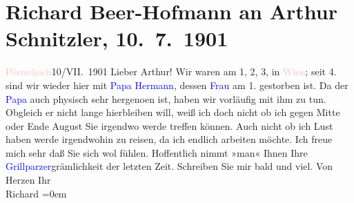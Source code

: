 

               \section[Richard Beer-Hofmann an Arthur Schnitzler, 10. 7. 1901]{ Richard Beer-Hofmann an Arthur Schnitzler,
               10. 7. 1901}\nopagebreak{}\rehead{ }\normalsize\beginnumbering{} \toendnotes[C]{\smallbreak\pagebreak[2]} 
\toendnotes[C]{\smallbreak}\pstart
           \raggedleft{}{\pb}\textcolor{pink}{Pörtschach}{}\ledrightnote{\textcolor{pink}{Pörtschach}}{ }10/VII. 1901\pend
           \pstart
           Lieber Arthur! Wir waren am 1, 2,
                  3, in \textcolor{pink}{Wien}{}\ledrightnote{\textcolor{pink}{Wien}}; seit 4. sind
               wir wieder hier mit \textcolor{blue}{Papa Hermann}{}\ledrightnote{\textcolor{blue}{Hermann Beer}}, dessen \textcolor{blue}{Frau}{} am 1.
               gestorben ist. Da der \textcolor{blue}{Papa}{} auch
               physisch sehr hergeno{\geminationm}en ist, haben wir vorläufig mit
               ihm zu tun. Obgleich er nicht lange hierbleiben will, weiß ich doch nicht ob ich
               gegen Mitte oder Ende August Sie irgendwo werde treffen
               können.\pend
           \pstart
           {\pb}Auch nicht ob ich Lust haben werde
               irgendwohin zu reisen, da ich endlich arbeiten möchte. Ich freue mich sehr daß Sie
               sich wol fühlen. Hoffentlich nimmt »man« Ihnen Ihre \textcolor{blue}{Grillparzer}{}\ledrightnote{\textcolor{blue}{Franz Grillparzer}}grämlichkeit der letzten Zeit. Schreiben Sie mir bald und
               viel.\pend
           \pstart
           Von Herzen Ihr{\\[\baselineskip]}\spacefill\mbox{Richard}\pend
           \leftskip=0em{}\endnumbering{}  
      